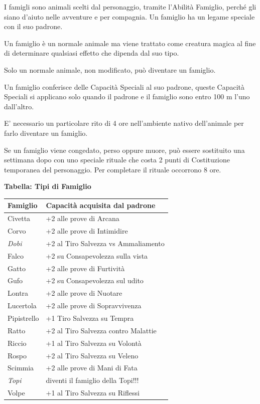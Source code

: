 \begin{multicols}{2}

I famigli sono animali scelti dal personaggio, tramite l'Abilità Famiglio, perché gli siano d'aiuto nelle avventure e per compagnia. Un famiglio ha un legame speciale con il suo padrone.

Un famiglio è un normale animale ma viene trattato come creatura magica al fine di determinare qualsiasi effetto che dipenda dal suo tipo.

Solo un normale animale, non modificato, può diventare un famiglio.

Un famiglio conferisce delle Capacità Speciali al suo padrone, queste Capacità Speciali si applicano solo quando il padrone e il famiglio sono entro 100 m l'uno dall'altro.

E' necessario un particolare rito di 4 ore nell'ambiente nativo dell'animale per farlo diventare un famiglio.

Se un famiglio viene congedato, perso oppure muore, può essere sostituito una settimana dopo con uno speciale rituale che costa 2 punti di Costituzione temporanea del personaggio. Per completare il rituale occorrono 8 ore.

\medskip

\textbf{Tabella: Tipi di Famiglio}

\medskip

\noindent\begin{tabularx}{\linewidth}{lX}
	\toprule
\rowcolor{gray!20}\textbf{Famiglio} & \textbf{Capacità acquisita dal padrone}\\
\toprule
Civetta & +2 alle prove di Arcana\\
\rowcolor{gray!20}Corvo & +2 alle prove di Intimidire\\
\emph{Dobi}& +2 al Tiro Salvezza vs Ammaliamento\\
\rowcolor{gray!20}Falco & +2 su Consapevolezza sulla vista\\
Gatto & +2 alle prove di Furtività\\
\rowcolor{gray!20}Gufo & +2 su Consapevolezza sul udito\\
Lontra & +2 alle prove di Nuotare\\
\rowcolor{gray!20}Lucertola & +2 alle prove di Sopravvivenza\\
Pipistrello & +1 Tiro Salvezza su Tempra\\
\rowcolor{gray!20}Ratto & +2 al Tiro Salvezza contro Malattie\\
Riccio & +1 al Tiro Salvezza su Volontà\\
\rowcolor{gray!20}Rospo & +2 al Tiro Salvezza su Veleno\\
Scimmia & +2 alle prove di Mani di Fata\\
\rowcolor{gray!20}\emph{Topi} & diventi il famiglio della Topi!!!\\
Volpe & +1 al Tiro Salvezza su Riflessi
\end{tabularx}


\end{multicols}
